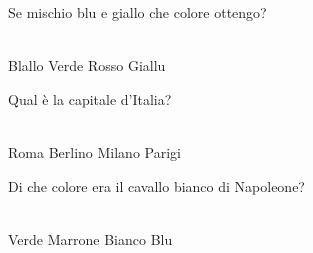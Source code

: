 \documentclass[a4paper,11pt]{exam}
\begin{document}
\begin{questions}
    
\question Se mischio blu e giallo che colore ottengo?\\\
\begin{oneparchoices}
  \choice Blallo
  \choice Verde
  \choice Rosso
  \choice Giallu
\end{oneparchoices}

    
\question Qual è la capitale d’Italia?\\\
\begin{oneparchoices}
  \choice Roma
  \choice Berlino
  \choice Milano
  \choice Parigi
\end{oneparchoices}

    
\question Di che colore era il cavallo bianco di Napoleone?\\\
\begin{oneparchoices}
  \choice Verde
  \choice Marrone
  \choice Bianco
  \choice Blu 
\end{oneparchoices}

    
\end{questions}

    
    \newpage
    
    
\end{document}
